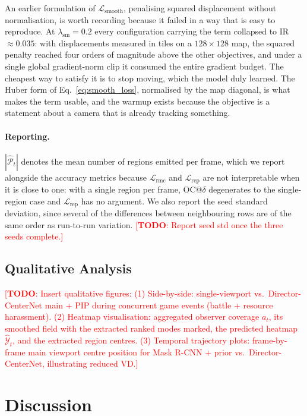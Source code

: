 \documentclass[preprint,12pt]{elsarticle}
\newcommand{\todo}[1]{\textcolor{red}{[\textbf{TODO}: #1]}}
\begin{document}
An earlier formulation of $\mathcal{L}_{\text{smooth}}$, penalising squared
displacement without normalisation, is worth recording because it failed in a
way that is easy to reproduce. At $\lambda_{\text{sm}} = 0.2$ every
configuration carrying the term collapsed to IR $\approx 0.035$: with
displacements measured in tiles on a $128 \times 128$ map, the squared penalty
reached four orders of magnitude above the other objectives, and under a single
global gradient-norm clip it consumed the entire gradient budget. The cheapest
way to satisfy it is to stop moving, which the model duly learned. The Huber
form of Eq.~\eqref{eq:smooth_loss}, normalised by the map diagonal, is what makes
the term usable, and the warmup exists because the objective is a statement
about a camera that is already tracking something.

\paragraph{Reporting.} $|\hat{\mathcal{P}}_t|$ denotes the mean number of
regions emitted per frame, which we report alongside the accuracy metrics
because $\mathcal{L}_{\text{rmc}}$ and $\mathcal{L}_{\text{rep}}$ are not
interpretable when it is close to one: with a single region per frame, OC@$\delta$
degenerates to the single-region case and $\mathcal{L}_{\text{rep}}$ has no
argument. We also report the seed standard deviation, since several of the
differences between neighbouring rows are of the same order as run-to-run
variation. \todo{Report seed std once the three seeds complete.}

\subsection{Qualitative Analysis}

\todo{Insert qualitative figures:
(1) Side-by-side: single-viewport vs.\ Director-CenterNet main + PIP during 
    concurrent game events (battle + resource harassment). 
(2) Heatmap visualisation: aggregated observer coverage $a_t$, its smoothed
    field with the extracted ranked modes marked, the predicted heatmap
    $\hat{\mathcal{Y}}_t$, and the extracted region centres.
(3) Temporal trajectory plots: frame-by-frame main viewport centre position 
    for Mask R-CNN + prior vs.\ Director-CenterNet, illustrating reduced VD.}

\section{Discussion}
\label{sec:discussion}
\end{document}
